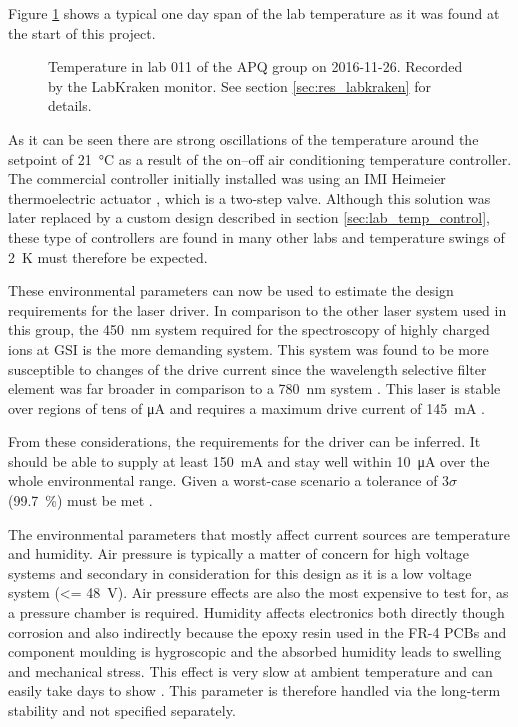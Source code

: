Figure \ref{fig:lab_temperature_start_of_project} shows a typical one day span of the lab temperature as it was found at the start of this project.
\begin{figure}[ht]
    \centering
    \caption{Temperature in lab 011 of the APQ group on 2016-11-26. Recorded by the LabKraken monitor. See section \ref{sec:res_labkraken} for details.}
    \label{fig:lab_temperature_start_of_project}
\end{figure}

As it can be seen there are strong oscillations of the temperature around the setpoint of \qty{21}{\celsius} as a result of the on–off air conditioning temperature controller. The commercial controller initially installed was using an IMI Heimeier  thermoelectric actuator \cite{datasheet_heimeier_emo_t}, which is a two-step valve. Although this solution was later replaced by a custom design described in section \ref{sec:lab_temp_control}, these type of controllers are found in many other labs and temperature swings of \qty{2}{\kelvin} must therefore be expected.

These environmental parameters can now be used to estimate the design requirements for the laser driver. In comparison to the other laser system used in this group, the \qty{450}{\nm} system \cite{thesis_baus} required for the spectroscopy of highly charged ions \cite{thesis_alex} at GSI is the more demanding system. This system was found to be more susceptible to changes of the drive current since the wavelength selective filter element was far broader in comparison to a \qty{780}{\nm} system \cite{two_filter_paper}. This laser is stable over regions of tens of \unit{\uA} and requires a maximum drive current of \qty{145}{\mA} \cite{datasheet_osram_pl450b}.

From these considerations, the requirements for the driver can be inferred. It should be able to supply at least \qty{150}{\mA} and stay well within \qty{10}{\uA} over the whole environmental range. Given a worst-case scenario a tolerance of $3\sigma$ (\qty{99.7}{\percent}) must be met \cite{worst_case_design}.

The environmental parameters that mostly affect current sources are temperature and humidity. Air pressure is typically a matter of concern for high voltage systems \cite{IPC-2221B} and secondary in consideration for this design as it is a low voltage system (\qty{<= 48}{\V}). Air pressure effects are also the most expensive to test for, as a pressure chamber is required. Humidity affects electronics both directly though corrosion and also indirectly because the epoxy resin used in the FR-4 PCBs and component moulding is hygroscopic and the absorbed humidity leads to swelling and mechanical stress. This effect is very slow at ambient temperature and can easily take days to show \cite{epoxy_humidity}. This parameter is therefore handled via the long-term stability and not specified separately.


